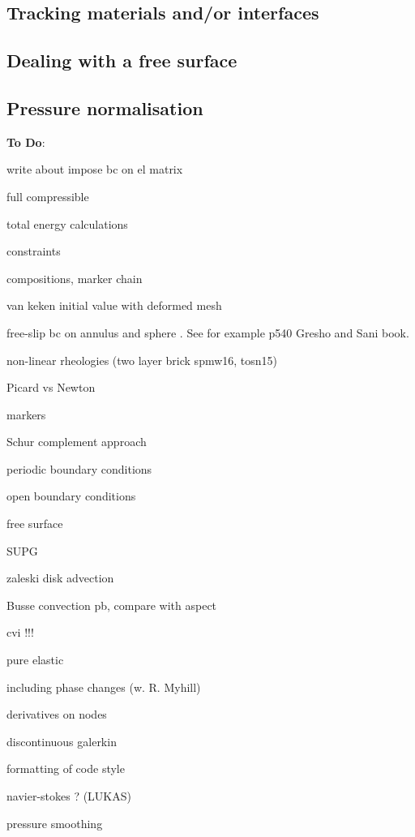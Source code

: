 \documentclass[a4paper]{article}
\begin{document}
\subsection{Tracking materials and/or interfaces}

\subsection{Dealing with a free surface}

\subsection{Pressure normalisation}







\newpage
{\bf To Do}:

write about impose bc on el matrix

full compressible 

total energy calculations

constraints

compositions, marker chain

van keken initial value with deformed mesh

free-slip bc on annulus and sphere . See for example p540 Gresho and Sani book.

non-linear rheologies (two layer brick spmw16, tosn15) 

Picard vs Newton

markers

Schur complement approach

periodic boundary conditions

open boundary conditions

free surface 

SUPG

zaleski disk advection

Busse convection pb, compare with aspect 

cvi !!!

pure elastic 

including phase changes (w. R. Myhill)

derivatives on nodes

discontinuous galerkin

formatting of code style

navier-stokes ? (LUKAS)

pressure smoothing
\end{document}
